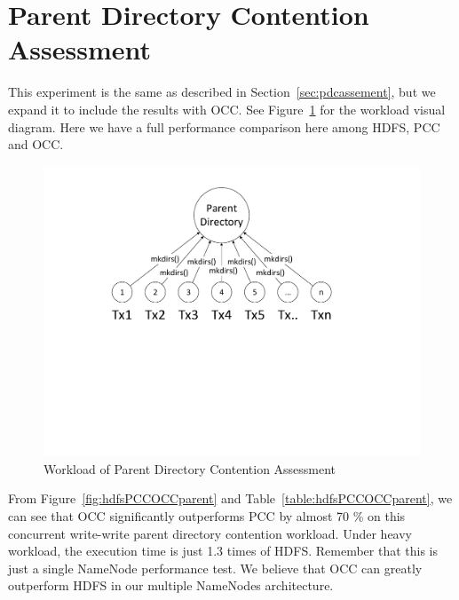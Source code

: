 \section{Parent Directory Contention Assessment}
\label{sec:ww}

This experiment is the same as described in Section~\ref{sec:pdcassement}, but we expand it to include the results with OCC. See Figure~\ref{fig:hdfsPCCOCCparentDiragram} for the workload visual diagram. Here we have a full performance comparison here among HDFS, PCC and OCC.

\begin{figure}[ht]
	\centering
	\includegraphics[scale=0.6]{figs/ww.pdf}
	\caption{Workload of Parent Directory Contention Assessment}
	\label{fig:hdfsPCCOCCparentDiragram}
\end{figure}

\noindent From Figure~\ref{fig:hdfsPCCOCCparent} and Table~\ref{table:hdfsPCCOCCparent}, we can see that OCC significantly outperforms PCC by almost 70 \% on this concurrent write-write parent directory contention workload. Under heavy workload, the execution time is just 1.3 times of HDFS. Remember that this is just a single NameNode performance test. We believe that OCC can greatly outperform HDFS in our multiple NameNodes architecture.

